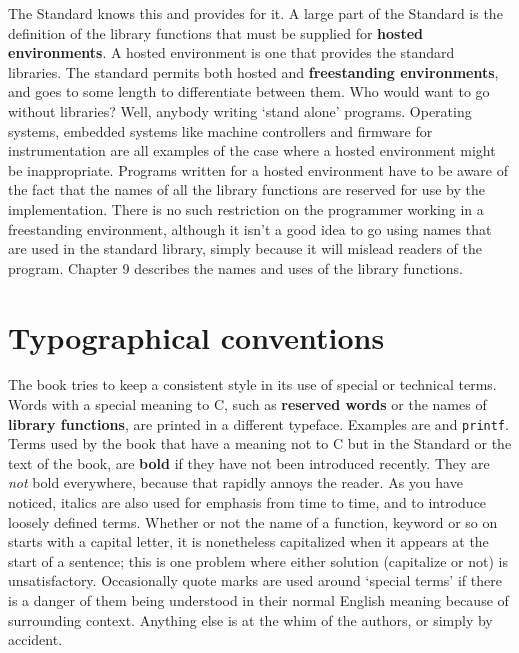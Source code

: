   The Standard knows this and provides for it. A large part of the Standard
   is the definition of the library functions that must be supplied for
   \textbf{hosted environments}. A hosted environment is one that provides
   the standard libraries. The standard permits both hosted and
   \textbf{freestanding environments}, and goes to some length to
   differentiate between them. Who would want to go without libraries? Well,
   anybody writing `stand alone' programs. Operating systems, embedded
   systems like machine controllers and firmware for instrumentation are all
   examples of the case where a hosted environment might be inappropriate.
   Programs written for a hosted environment have to be aware of the fact that
   the names of all the library functions are reserved for use by the
   implementation. There is no such restriction on the programmer working in a
   freestanding environment, although it isn't a good idea to go using names
   that are used in the standard library, simply because it will mislead
   readers of the program. Chapter 9 describes the names and uses
   of the library functions.


 
        \section*{Typographical conventions}
        

  

  The book tries to keep a consistent style in its use of special or
   technical terms. Words with a special meaning to C, such as
   \textbf{reserved words} or the names of \textbf{library functions}, are
   printed in a different typeface. Examples are \kint{} and
   \texttt{printf}. Terms used by the book that have a meaning not to C
   but in the Standard or the text of the book, are \textbf{bold} if they
   have not been introduced recently. They are \textit{not} bold everywhere,
   because that rapidly annoys the reader. As you have noticed, italics are
   also used for emphasis from time to time, and to introduce loosely defined
   terms. Whether or not the name of a function, keyword or so on starts with
   a capital letter, it is nonetheless capitalized when it appears at the
   start of a sentence; this is one problem where either solution (capitalize
   or not) is unsatisfactory. Occasionally quote marks are used around
   `special terms' if there is a danger of them being understood in
   their normal English meaning because of surrounding context. Anything else
   is at the whim of the authors, or simply by accident.


